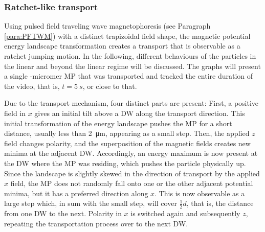 \subsubsection{Ratchet-like transport}
Using pulsed field traveling wave magnetophoresis (see Paragraph \ref{para:PFTWM}) with a distinct trapizoidal field shape, the magnetic potential energy landscape transformation creates a transport that is observable as a ratchet jumping motion.
In the following, different behaviours of the particles in the linear and beyond the linear regime will be discussed.
The graphs will present a single -micromer \ac{MP} that was transported and tracked the entire duration of the video, that is, $t=\SI{5}{s}$, or close to that.


Due to the transport mechanism, four distinct parts are present:
First, a positive field in $x$ gives an initial tilt above a \ac{DW} along the transport direction.
This initial transformation of the energy landscape pushes the \ac{MP} for a short distance, usually less than  \SI{2}{\micro\m}, appearing as a small step.
Then, the applied $z$ field changes polarity, and the superposition of the magnetic fields creates new minima at the adjacent \ac{DW}.
Accordingly, an energy maximum is now present at the \ac{DW} where the \ac{MP} was residing, which pushes the particle physically up.
Since the landscape is slightly skewed in the direction of transport by the applied $x$ field, the \ac{MP} does not randomly fall onto one or the other adjacent potential minima, but it has a preferred direction along $x$.
This is now observable as a large step which, in sum with the small step, will cover $\frac{1}{2}d$, that is, the distance from one \ac{DW} to the next.
Polarity in $x$ is switched again and subsequently $z$, repeating the transportation process over to the next \ac{DW}.

